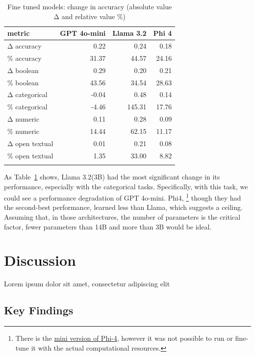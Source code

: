 \documentclass[
  12pt,
  letterpaper,
]{book}
\begin{document}
\begin{longtable}[t]{lrrr}

\toprule
metric & GPT 4o-mini & Llama 3.2 & Phi 4\\
\midrule
Δ accuracy & 0.22 & 0.24 & 0.18\\
\% accuracy & 31.37 & 44.57 & 24.16\\
Δ boolean & 0.29 & 0.20 & 0.21\\
\% boolean & 43.56 & 34.54 & 28.63\\
Δ categorical & -0.04 & 0.48 & 0.14\\
\addlinespace
\% categorical & -4.46 & 145.31 & 17.76\\
Δ numeric & 0.11 & 0.28 & 0.09\\
\% numeric & 14.44 & 62.15 & 11.17\\
Δ open textual & 0.01 & 0.21 & 0.08\\
\% open textual & 1.35 & 33.00 & 8.82\\
\bottomrule


\caption{\label{tbl-finetune-delta}Fine tuned models: change in accuracy
(absolute value Δ and relative value \%)}

\tabularnewline
\end{longtable}

As Table~\ref{tbl-finetune-delta} shows, Llama 3.2(3B) had the most
significant change in its performance, especially with the categorical
tasks. Specifically, with this task, we could see a performance
degradation of GPT 4o-mini. Phi4, \footnote{There is the
  \href{https://huggingface.co/microsoft/Phi-4-mini-instruct}{mini
  version of Phi-4}, however it was not possible to run or fine-tune it
  with the actual computational resources.} though they had the
second-best performance, learned less than Llama, which suggests a
ceiling. Assuming that, in those architectures, the number of parameters
is the critical factor, fewer parameters than 14B and more than 3B would
be ideal.


\chapter{Discussion}\label{discussion}

Lorem ipsum dolor sit amet, consectetur adipiscing elit

\section{Key Findings}\label{key-findings}
\end{document}

